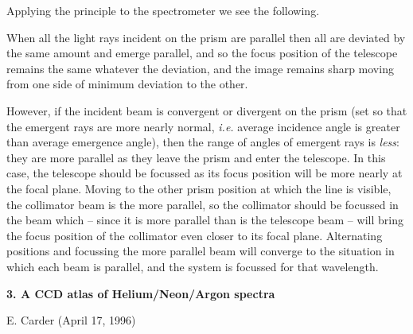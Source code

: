 \documentclass[12pt]{article}
\newcommand{\ie}{ {\em i.e. }}
\begin{document}

Applying the principle to the spectrometer we see the following.

When all the light rays incident on the prism are parallel then all are deviated by the same amount and emerge parallel, and so the focus position of the telescope remains the same whatever the deviation, and the image remains sharp  moving from one side of minimum deviation to the other. 

However, if the incident beam is convergent or divergent on the prism (set so that the emergent rays are  more nearly normal, \ie average incidence angle is greater than average emergence angle), then the range of angles of emergent rays is {\sl less\/}: they are more parallel as they leave the prism and enter the telescope. In this case, the telescope should be focussed as its focus position will be more nearly at the focal plane. Moving to the other prism position at which the line is visible, the collimator beam is the more parallel, so the collimator should be focussed in the beam which -- since it is more parallel than is the telescope beam -- will bring the focus position of the collimator even closer to its focal plane. Alternating positions and focussing the more parallel beam will converge to the situation in which each beam is parallel, and the system is focussed for that wavelength.


\newpage

\begin{center}
{\large{\bf 3. A CCD atlas of Helium/Neon/Argon spectra}}
\end{center}

\vspace{1cm} 


\centerline{\hspace{-1cm} E. Carder (April 17, 1996)}

\vspace{5cm}
\end{document}
